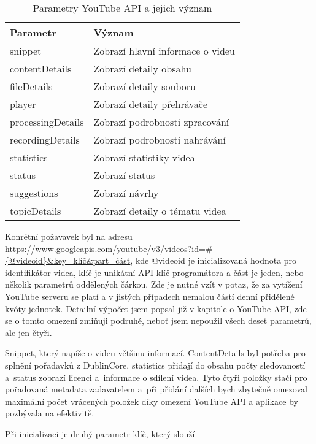 \begin{table}[h!]
\centering
\caption[Parametry YouTube API a jejich význam]{Parametry YouTube API a jejich význam}\label{tab:apiparams}
\begin{tabular}{| l | l |}
\hline
Parametr & Význam \\
\hline
snippet & Zobrazí hlavní informace o videu \\
\hline
contentDetails & Zobrazí detaily obsahu \\
\hline
fileDetails & Zobrazí detaily souboru \\
\hline
player & Zobrazí detaily přehrávače \\
\hline
processingDetails & Zobrazí podrobnosti zpracování \\
\hline
recordingDetails & Zobrazí podrobnosti nahrávání \\
\hline
statistics & Zobrazí statistiky videa \\
\hline
status & Zobrazí status \\
\hline
suggestions & Zobrazí návrhy \\
\hline
topicDetails & Zobrazí detaily o tématu videa \\
\hline
\end{tabular}
\end{table}

\par Konrétní požavavek byl na adresu \url{https://www.googleapis.com/youtube/v3/videos?id=#{@videoid}&key=klíč&part=část}, kde @videoid je inicializovaná hodnota pro identifikátor videa, klíč je unikátní API klíč programátora a část je jeden, nebo několik parametrů oddělených čárkou. Zde je nutné vzít v potaz, že za vytížení YouTube serveru se platí a v jistých případech nemalou částí denní přidělené kvóty jednotek. Detailní výpočet jsem popsal již v kapitole o YouTube API, zde se o tomto omezení zmiňuji podruhé, neboť jsem nepoužil všech deset parametrů, ale jen čtyři.
\par Snippet, který napíše o videu většinu informací. ContentDetails byl potřeba pro splnění pořadavků z DublinCore, statistics přidají do obsahu počty sledovaností a~status zobrazí licenci a~informace o sdílení videa. Tyto čtyři položky stačí pro pořadovaná metadata zadavatelem a~při přidání dalších bych zbytečně omezoval maximální počet vrácených položek díky omezení YouTube API a aplikace by pozbývala na efektivitě.
\par Při inicializaci je druhý parametr klíč, který slouží 


